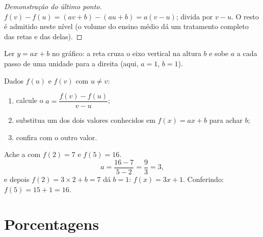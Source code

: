 \begin{proof}[Demonstração do último ponto]
$f(v) - f(u) = (av + b) - (au + b) = a(v - u)$; divida por $v - u$. O
resto é admitido neste nível (o volume do ensino médio dá um tratamento
completo das retas e das  delas).
\end{proof}

\begin{omfigure}

{\small Ler $y = ax + b$ no gráfico: a reta cruza o eixo vertical na
altura $b$ e sobe $a$ a cada passo de uma unidade para a direita (aqui,
$a = 1$, $b = 1$).}
\end{omfigure}

\begin{method}\label{met:g9:linfunc:findaffine}
Dados $f(u)$ e $f(v)$ com $u \neq v$:
\begin{enumerate}
  \item calcule o 
        $a = \dfrac{f(v) - f(u)}{v - u}$;
  \item substitua um dos dois valores conhecidos em $f(x) = ax + b$
        para achar $b$;
  \item confira com o outro valor.
\end{enumerate}
\end{method}

\begin{example}\label{ex:g9:linfunc:findaffine}
Ache a  com $f(2) = 7$ e $f(5) = 16$.
\[
a = \frac{16 - 7}{5 - 2} = \frac93 = 3 ,
\]
e depois $f(2) = 3 \times 2 + b = 7$ dá $b = 1$: $f(x) = 3x + 1$.
Conferindo: $f(5) = 15 + 1 = 16$.
\end{example}

\section{Porcentagens}

